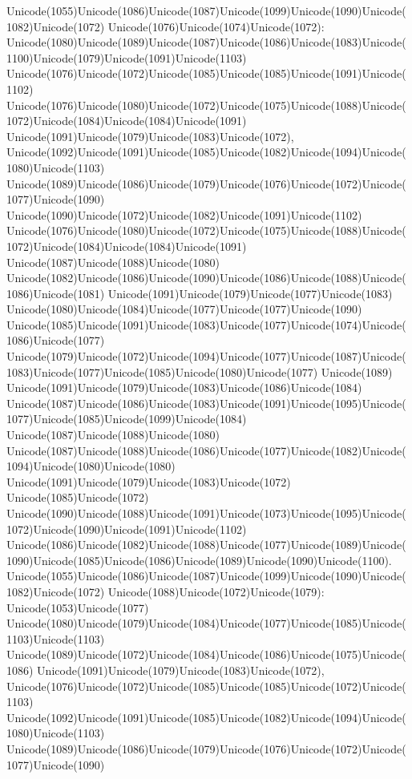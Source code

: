 \documentclass[a4paper,11pt]{report}
\begin{document}
{{{ Unicode(1055)Unicode(1086)Unicode(1087)Unicode(1099)Unicode(1090)Unicode(1082)Unicode(1072)
Unicode(1076)Unicode(1074)Unicode(1072):
Unicode(1080)Unicode(1089)Unicode(1087)Unicode(1086)Unicode(1083)Unicode(1100)Unicode(1079)Unicode(1091)Unicode(1103)
Unicode(1076)Unicode(1072)Unicode(1085)Unicode(1085)Unicode(1091)Unicode(1102)
Unicode(1076)Unicode(1080)Unicode(1072)Unicode(1075)Unicode(1088)Unicode(1072)Unicode(1084)Unicode(1084)Unicode(1091)
Unicode(1091)Unicode(1079)Unicode(1083)Unicode(1072),
Unicode(1092)Unicode(1091)Unicode(1085)Unicode(1082)Unicode(1094)Unicode(1080)Unicode(1103)
Unicode(1089)Unicode(1086)Unicode(1079)Unicode(1076)Unicode(1072)Unicode(1077)Unicode(1090)
Unicode(1090)Unicode(1072)Unicode(1082)Unicode(1091)Unicode(1102)
Unicode(1076)Unicode(1080)Unicode(1072)Unicode(1075)Unicode(1088)Unicode(1072)Unicode(1084)Unicode(1084)Unicode(1091)
Unicode(1087)Unicode(1088)Unicode(1080)
Unicode(1082)Unicode(1086)Unicode(1090)Unicode(1086)Unicode(1088)Unicode(1086)Unicode(1081)
Unicode(1091)Unicode(1079)Unicode(1077)Unicode(1083)
Unicode(1080)Unicode(1084)Unicode(1077)Unicode(1077)Unicode(1090)
Unicode(1085)Unicode(1091)Unicode(1083)Unicode(1077)Unicode(1074)Unicode(1086)Unicode(1077)
Unicode(1079)Unicode(1072)Unicode(1094)Unicode(1077)Unicode(1087)Unicode(1083)Unicode(1077)Unicode(1085)Unicode(1080)Unicode(1077)
Unicode(1089)
Unicode(1091)Unicode(1079)Unicode(1083)Unicode(1086)Unicode(1084)
Unicode(1087)Unicode(1086)Unicode(1083)Unicode(1091)Unicode(1095)Unicode(1077)Unicode(1085)Unicode(1099)Unicode(1084)
Unicode(1087)Unicode(1088)Unicode(1080)
Unicode(1087)Unicode(1088)Unicode(1086)Unicode(1077)Unicode(1082)Unicode(1094)Unicode(1080)Unicode(1080)
Unicode(1091)Unicode(1079)Unicode(1083)Unicode(1072)
Unicode(1085)Unicode(1072)
Unicode(1090)Unicode(1088)Unicode(1091)Unicode(1073)Unicode(1095)Unicode(1072)Unicode(1090)Unicode(1091)Unicode(1102)
Unicode(1086)Unicode(1082)Unicode(1088)Unicode(1077)Unicode(1089)Unicode(1090)Unicode(1085)Unicode(1086)Unicode(1089)Unicode(1090)Unicode(1100).
Unicode(1055)Unicode(1086)Unicode(1087)Unicode(1099)Unicode(1090)Unicode(1082)Unicode(1072)
Unicode(1088)Unicode(1072)Unicode(1079): Unicode(1053)Unicode(1077)
Unicode(1080)Unicode(1079)Unicode(1084)Unicode(1077)Unicode(1085)Unicode(1103)Unicode(1103)
Unicode(1089)Unicode(1072)Unicode(1084)Unicode(1086)Unicode(1075)Unicode(1086)
Unicode(1091)Unicode(1079)Unicode(1083)Unicode(1072),
Unicode(1076)Unicode(1072)Unicode(1085)Unicode(1085)Unicode(1072)Unicode(1103)
Unicode(1092)Unicode(1091)Unicode(1085)Unicode(1082)Unicode(1094)Unicode(1080)Unicode(1103)
Unicode(1089)Unicode(1086)Unicode(1079)Unicode(1076)Unicode(1072)Unicode(1077)Unicode(1090)
}}}
\end{document}

